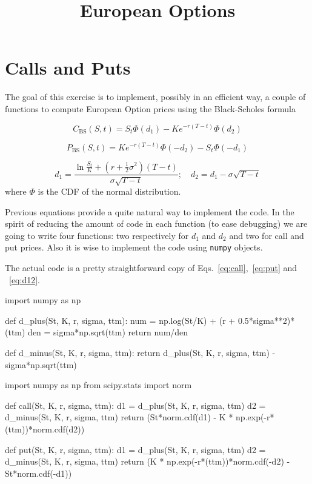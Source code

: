 \documentclass[]{article}
\title{European Options}
\author{}
\begin{document}
\maketitle

\section{Calls and Puts}
The goal of this exercise is to implement, possibly in an efficient way, a couple of functions to compute European Option prices using the Black-Scholes formula

\begin{equation}
C_{\textrm{BS}}(S,t)=S_{t}\Phi(d_{1})-Ke^{-r(T-t)}\Phi(d_{2})
\label{eq:call}
\end{equation}

\begin{equation}
P_{\textrm{BS}}(S,t)=Ke^{-r(T-t)}\Phi(-d_{2}) - S_{t}\Phi(-d_{1})
\label{eq:put}
\end{equation}

\begin{equation}
d_{1}={\frac  {\ln {\frac  {S_{t}}{K}}+\left(r+{\frac{1}{2}}\sigma^{2}\right)(T-t)}{\sigma \sqrt{T-t}}};\quad d_{{2}}=d_{1}-\sigma \sqrt{T-t}
\label{eq:d12}
\end{equation}
where $\Phi$ is the CDF of the normal distribution.

Previous equations provide a quite natural way to implement the code. In the spirit of reducing the amount of code in each function (to ease debugging) we are going to write four functions: two respectively for $d_1$ and $d_2$ and two for call and put prices.
Also it is wise to implement the code using \texttt{numpy} objects.

The actual code is a pretty straightforward copy of Eqs.~\ref{eq:call},~\ref{eq:put} and ~\ref{eq:d12}.

\begin{ipython}
import numpy as np

def d_plus(St, K, r, sigma, ttm):
    num = np.log(St/K) + (r + 0.5*sigma**2)*(ttm)
    den = sigma*np.sqrt(ttm)
    return num/den

def d_minus(St, K, r, sigma, ttm):
    return d_plus(St, K, r, sigma, ttm) - sigma*np.sqrt(ttm)
\end{ipython}

\begin{ipython}
import numpy as np
from scipy.stats import norm
	
def call(St, K, r, sigma, ttm):
    d1 = d_plus(St, K, r, sigma, ttm)
    d2 = d_minus(St, K, r, sigma, ttm)
    return (St*norm.cdf(d1) - K * np.exp(-r*(ttm))*norm.cdf(d2))
            
def put(St, K, r, sigma, ttm):
    d1 = d_plus(St, K, r, sigma, ttm)
    d2 = d_minus(St, K, r, sigma, ttm)
    return (K * np.exp(-r*(ttm))*norm.cdf(-d2) - St*norm.cdf(-d1))
\end{ipython}
\end{document}
